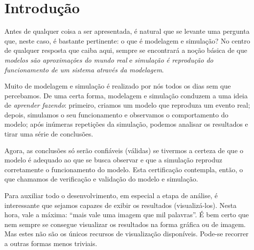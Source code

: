 \documentclass[a4paper,12pt,oneside,onecolumn]{uerj}
\begin{document}




\sumario


\mainmatter

\chapter*{Introdução}

Antes de qualquer coisa a ser apresentada, é natural que se levante uma pergunta que, neste caso, é bastante pertinente: o que é modelagem e simulação? No centro de qualquer resposta que caiba aqui, sempre se encontrará a noção básica de que \emph{modelos são aproximações do mundo real} e \emph{simulação é reprodução do funcionamento de um sistema através da modelagem}.

Muito de modelagem e simulação é realizado por nós todos os dias sem que percebamos. De uma certa forma, modelagem e simulação conduzem a uma ideia de \emph{aprender fazendo}: primeiro, criamos um modelo que reproduza um evento real; depois, simulamos o seu funcionamento e observamos o comportamento do modelo; após inúmeras repetições da simulação, podemos analisar os resultados e tirar uma série de conclusões.

Agora, as conclusões só serão confiáveis (válidas) se tivermos a certeza de que o modelo é adequado ao que se busca observar e que a simulação reproduz corretamente o funcionamento do modelo. Esta certificação contempla, então, o que chamamos de verificação e validação do modelo e simulação.

Para auxiliar todo o desenvolvimento, em especial a etapa de análise, é interessante que sejamos capazes de exibir os resultados (visualizá-los). Nesta hora, vale a máxima: ``mais vale uma imagem que mil palavras''. É bem certo que nem sempre se consegue visualizar os resultados na forma gráfica ou de imagem. Mas estes não são os únicos recursos de visualização disponíveis. Pode-se recorrer a outras formas menos triviais.
\end{document}
